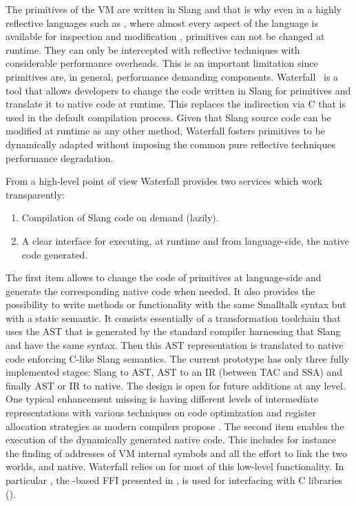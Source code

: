 The primitives of the VM are written in Slang and that is why even in a highly reflective languages such as \ST, where almost every aspect of the language is available for inspection and modification \cite{Denk10a}, primitives can not be changed at runtime. They can only be intercepted with reflective techniques with considerable performance overheads.
This is an important limitation since primitives are, in general, performance demanding components.
Waterfall~\cite{Char13a,Waterfall} is a tool that allows developers to change the code written in Slang for primitives and translate it to native code at runtime.
This replaces the indirection via C that is used in the default compilation process.
Given that Slang source code can be modified at runtime as any other \ST method, Waterfall fosters primitives to be dynamically adapted without imposing the common pure reflective techniques performance degradation.

From a high-level point of view Waterfall provides two services which work transparently: 
%
\begin{enumerate}
	\item Compilation of Slang code on demand (lazily).
	\item A clear interface for executing, at runtime and from language-side, the native code generated.
\end{enumerate}
%
The first item allows to change the code of primitives at language-side and generate the corresponding native code when needed. 
It also provides the possibility to write methods or functionality with the same Smalltalk syntax but with a static semantic. 
It consists essentially of a transformation toolchain that uses the AST that is generated by the standard \PH compiler harnessing that Slang and \ST have the same syntax. 
Then this AST representation is translated to native code enforcing C-like Slang semantics. The current prototype has only three fully implemented stages: Slang to AST, AST to an IR (between TAC and SSA) and finally AST or IR to native. The design is open for future additions at any level. One typical enhancement missing is having different levels of intermediate representations with various techniques on code optimization and register allocation strategies as modern compilers propose \cite[Ch.\ 1]{Appe98a}. 
The second item enables the execution of the dynamically generated native code.
This includes for instance the finding of addresses of VM internal symbols and all the effort to link the two worlds, \ST and native.
Waterfall relies on \B for most of this low-level functionality.
In particular \NB, the \B-based FFI presented in , is used for interfacing with C libraries (). 

